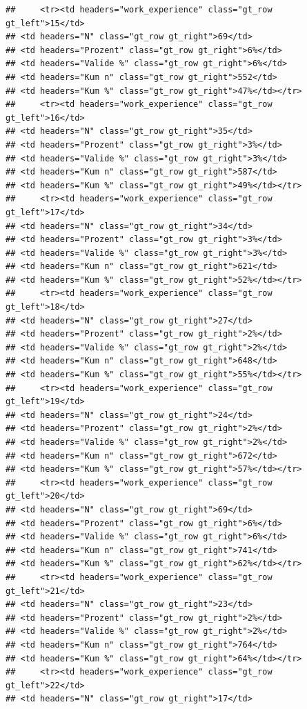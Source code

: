 \documentclass[
  a4paper,
  DIV=11,
  numbers=noendperiod]{scrartcl}
\begin{document}
\begin{verbatim}
##     <tr><td headers="work_experience" class="gt_row gt_left">15</td>
## <td headers="N" class="gt_row gt_right">69</td>
## <td headers="Prozent" class="gt_row gt_right">6%</td>
## <td headers="Valide %" class="gt_row gt_right">6%</td>
## <td headers="Kum n" class="gt_row gt_right">552</td>
## <td headers="Kum %" class="gt_row gt_right">47%</td></tr>
##     <tr><td headers="work_experience" class="gt_row gt_left">16</td>
## <td headers="N" class="gt_row gt_right">35</td>
## <td headers="Prozent" class="gt_row gt_right">3%</td>
## <td headers="Valide %" class="gt_row gt_right">3%</td>
## <td headers="Kum n" class="gt_row gt_right">587</td>
## <td headers="Kum %" class="gt_row gt_right">49%</td></tr>
##     <tr><td headers="work_experience" class="gt_row gt_left">17</td>
## <td headers="N" class="gt_row gt_right">34</td>
## <td headers="Prozent" class="gt_row gt_right">3%</td>
## <td headers="Valide %" class="gt_row gt_right">3%</td>
## <td headers="Kum n" class="gt_row gt_right">621</td>
## <td headers="Kum %" class="gt_row gt_right">52%</td></tr>
##     <tr><td headers="work_experience" class="gt_row gt_left">18</td>
## <td headers="N" class="gt_row gt_right">27</td>
## <td headers="Prozent" class="gt_row gt_right">2%</td>
## <td headers="Valide %" class="gt_row gt_right">2%</td>
## <td headers="Kum n" class="gt_row gt_right">648</td>
## <td headers="Kum %" class="gt_row gt_right">55%</td></tr>
##     <tr><td headers="work_experience" class="gt_row gt_left">19</td>
## <td headers="N" class="gt_row gt_right">24</td>
## <td headers="Prozent" class="gt_row gt_right">2%</td>
## <td headers="Valide %" class="gt_row gt_right">2%</td>
## <td headers="Kum n" class="gt_row gt_right">672</td>
## <td headers="Kum %" class="gt_row gt_right">57%</td></tr>
##     <tr><td headers="work_experience" class="gt_row gt_left">20</td>
## <td headers="N" class="gt_row gt_right">69</td>
## <td headers="Prozent" class="gt_row gt_right">6%</td>
## <td headers="Valide %" class="gt_row gt_right">6%</td>
## <td headers="Kum n" class="gt_row gt_right">741</td>
## <td headers="Kum %" class="gt_row gt_right">62%</td></tr>
##     <tr><td headers="work_experience" class="gt_row gt_left">21</td>
## <td headers="N" class="gt_row gt_right">23</td>
## <td headers="Prozent" class="gt_row gt_right">2%</td>
## <td headers="Valide %" class="gt_row gt_right">2%</td>
## <td headers="Kum n" class="gt_row gt_right">764</td>
## <td headers="Kum %" class="gt_row gt_right">64%</td></tr>
##     <tr><td headers="work_experience" class="gt_row gt_left">22</td>
## <td headers="N" class="gt_row gt_right">17</td>

\end{verbatim}
\end{document}
